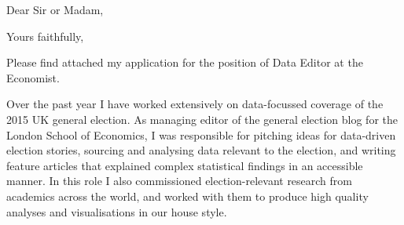 \documentclass[11pt,a4paper,sans]{moderncv}        %
\begin{document}




\clearpage
\date{\today}
\opening{Dear Sir or Madam,}
\closing{Yours faithfully,}
\makelettertitle

Please find attached my application for the position of Data Editor at the Economist.

Over the past year I have worked extensively on data-focussed coverage of the 2015 UK general election. As managing editor of the general election blog for the London School of Economics, I was responsible for pitching ideas for data-driven election stories, sourcing and analysing data relevant to the election, and writing feature articles that explained complex statistical findings in an accessible manner. In this role I also commissioned election-relevant research from academics across the world, and worked with them to produce high quality analyses and visualisations in our house style.
\end{document}
